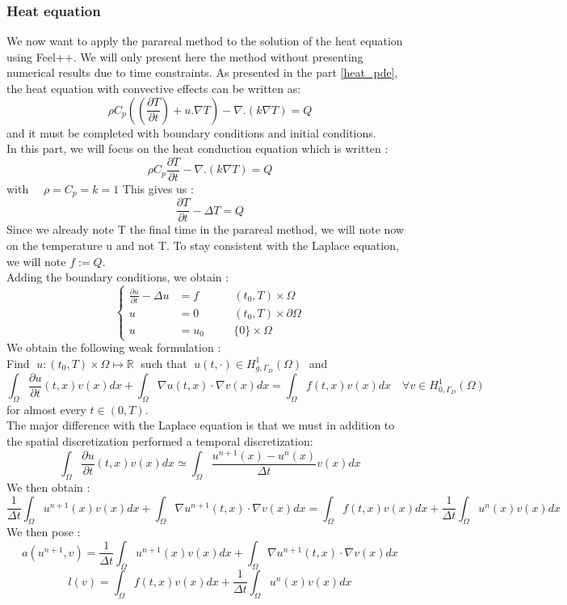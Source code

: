 \subsubsection{Heat equation}
\label{heat}

We now want to apply the parareal method to the solution of the heat equation using Feel++. We will only present here the method without presenting numerical results due to time constraints. As presented in the part \ref{heat_pde}, the heat equation with convective effects can be written as:
$$\rho C_p((\frac{\partial T}{\partial t})+u . \nabla T)-\nabla .(k \nabla T)=Q$$
and it must be completed  with boundary conditions and initial conditions. \\
In this part, we will focus on the heat conduction equation which is written :
$$\rho C_p\frac{\partial T}{\partial t}-\nabla .(k \nabla T)=Q$$
with $\quad \rho=C_p=k=1$
This gives us : \\
$$\frac{\partial T}{\partial t}-\Delta T=Q$$
Since we already note T the final time in the parareal method, we will note now on the temperature u and not T. To stay consistent with the Laplace equation, we will note $f:=Q$. \\
Adding the boundary conditions, we obtain :
\begin{equation}
	\left\{\begin{aligned}
		\frac{\partial u}{\partial t}-\Delta u &= f \quad&&(t_0,T)\times\Omega \\
		u&=0 \quad&&(t_0,T)\times\partial\Omega\\
		u&=u_0 \quad &&\{0\}\times\Omega
	\end{aligned}\right.
\end{equation}
We obtain the following weak formulation : \\
Find $\; u:(t_0,T)\times\Omega \mapsto \mathbb{R} \;$ such that $\; u(t,\cdot)\in H_{g,\Gamma_D}^1(\Omega) \;$ and
$$\int_\Omega \frac{\partial u}{\partial t}(t,x)v(x)dx+\int_\Omega \nabla u(t,x)\cdot\nabla v(x)dx = \int_\Omega f(t,x)v(x)dx \quad \forall v\in H_{0,\Gamma_D}^1(\Omega)$$
for almost every $t\in(0,T)$. \\
The major difference with the Laplace equation is that we must in addition to the spatial discretization performed a temporal discretization:
$$\int_\Omega \frac{\partial u}{\partial t}(t,x)v(x)dx \simeq \int_\Omega \frac{u^{n+1}(x)-u^n(x)}{\Delta t}v(x)dx$$
We then obtain :
$$\frac{1}{\Delta t}\int_\Omega u^{n+1}(x)v(x)dx+\int_\Omega \nabla u^{n+1}(t,x)\cdot\nabla v(x)dx = \int_\Omega f(t,x)v(x)dx + \frac{1}{\Delta t}\int_\Omega u^n(x)v(x)dx$$
We then pose :
$$a(u^{n+1},v)=\frac{1}{\Delta t}\int_\Omega u^{n+1}(x)v(x)dx+\int_\Omega \nabla u^{n+1}(t,x)\cdot\nabla v(x)dx$$
$$l(v)=\int_\Omega f(t,x)v(x)dx + \frac{1}{\Delta t}\int_\Omega u^n(x)v(x)dx$$


